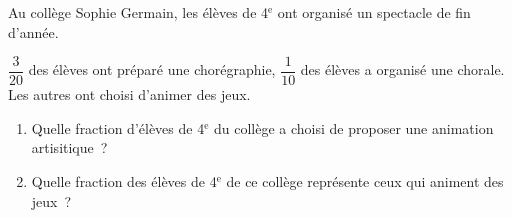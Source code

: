 \documentclass[exercice]{thedocument}%
\begin{document}
%
    Au collège Sophie Germain, les élèves de 4$^{\text{e}}$ ont organisé un
    spectacle de fin d'année.\par\smallskip
    \begingroup
        \baselineskip20pt
        $\dfrac3{20}$ des élèves ont préparé une chorégraphie, $\dfrac1{10}$
        des élèves a organisé une chorale. Les autres ont choisi d'animer
        des jeux.\par\smallskip\noindent
    \endgroup
    {\centering{}\par}
    \begin{enumerate}
        \item Quelle fraction d'élèves de 4$^{\text{e}}$ du collège a choisi de
        proposer une animation artisitique~?
        \item Quelle fraction des élèves de 4$^{\text{e}}$ de ce collège
        représente ceux qui animent des jeux~?
    \end{enumerate}
\end{document}
